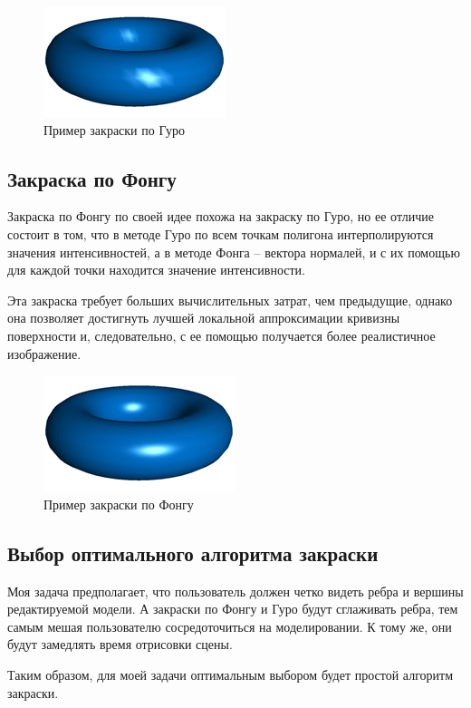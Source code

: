 \begin{figure}[h]
	\centering
	\includegraphics[scale=0.7]{inc/img/guro.png}
	\caption{Пример закраски по Гуро}
	\label{fig:guro}
\end{figure} 

\subsection{Закраска по Фонгу}

Закраска по Фонгу \cite{rogers_alg} по своей идее похожа на закраску по Гуро, но ее отличие состоит в том, что в методе Гуро по всем точкам полигона интерполируются значения интенсивностей, а в методе Фонга – вектора нормалей, и с их помощью для каждой точки находится значение интенсивности.

Эта закраска требует больших вычислительных затрат, чем предыдущие, однако она позволяет достигнуть лучшей локальной аппроксимации кривизны поверхности и, следовательно, с ее помощью получается более реалистичное изображение.

\begin{figure}[h]
	\centering
	\includegraphics[scale=0.7]{inc/img/fong.png}
	\caption{Пример закраски по Фонгу}
	\label{fig:fong}
\end{figure} 


\subsection{Выбор оптимального алгоритма закраски}
Моя задача предполагает, что пользователь должен четко видеть ребра и вершины редактируемой модели. А закраски по Фонгу и Гуро будут сглаживать ребра, тем самым мешая пользователю сосредоточиться на моделировании. К тому же, они будут замедлять время отрисовки сцены.

Таким образом, для моей задачи оптимальным выбором будет простой алгоритм закраски.




